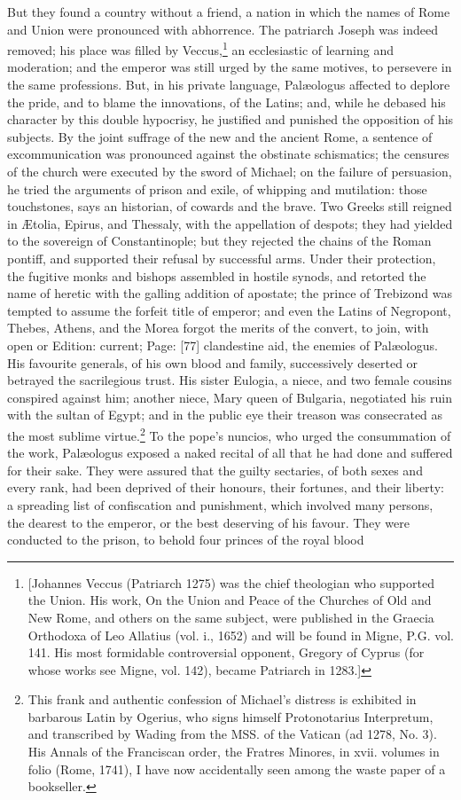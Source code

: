 But they found a country without a friend, a nation in which the names of Rome and Union were pronounced with abhorrence. The patriarch Joseph was indeed removed; his place was filled by Veccus,\footnote{[Johannes Veccus (Patriarch 1275) was the chief theologian who supported the Union. His work, On the Union and Peace of the Churches of Old and New Rome, and others on the same subject, were published in the Graecia Orthodoxa of Leo Allatius (vol. i., 1652) and will be found in Migne, P.G. vol. 141. His most formidable controversial opponent, Gregory of Cyprus (for whose works see Migne, vol. 142), became Patriarch in 1283.]} an ecclesiastic of learning and moderation; and the emperor was still urged by the same motives, to persevere in the same professions. But, in his private language, Palæologus affected to deplore the pride, and to blame the innovations, of the Latins; and, while he debased his character by this double hypocrisy, he justified and punished the opposition of his subjects. By the joint suffrage of the new and the ancient Rome, a sentence of excommunication was pronounced against the obstinate schismatics; the censures of the church were executed by the sword of Michael; on the failure of persuasion, he tried the arguments of prison and exile, of whipping and mutilation: those touchstones, says an historian, of cowards and the brave. Two Greeks still reigned in Ætolia, Epirus, and Thessaly, with the appellation of despots; they had yielded to the sovereign of Constantinople; but they rejected the chains of the Roman pontiff, and supported their refusal by successful arms. Under their protection, the fugitive monks and bishops assembled in hostile synods, and retorted the name of heretic with the galling addition of apostate; the prince of Trebizond was tempted to assume the forfeit title of emperor; and even the Latins of Negropont, Thebes, Athens, and the Morea forgot the merits of the convert, to join, with open or Edition: current; Page: [77] clandestine aid, the enemies of Palæologus. His favourite generals, of his own blood and family, successively deserted or betrayed the sacrilegious trust. His sister Eulogia, a niece, and two female cousins conspired against him; another niece, Mary queen of Bulgaria, negotiated his ruin with the sultan of Egypt; and in the public eye their treason was consecrated as the most sublime virtue.\footnote{This frank and authentic confession of Michael\texthebrew{}’s distress is exhibited in barbarous Latin by Ogerius, who signs himself Protonotarius Interpretum, and transcribed by Wading from the MSS. of the Vatican (ad 1278, No. 3). His Annals of the Franciscan order, the Fratres Minores, in xvii. volumes in folio (Rome, 1741), I have now accidentally seen among the waste paper of a bookseller.} To the pope\texthebrew{}’s nuncios, who urged the consummation of the work, Palæologus exposed a naked recital of all that he had done and suffered for their sake. They were assured that the guilty sectaries, of both sexes and every rank, had been deprived of their honours, their fortunes, and their liberty: a spreading list of confiscation and punishment, which involved many persons, the dearest to the emperor, or the best deserving of his favour. They were conducted to the prison, to behold four princes of the royal blood 